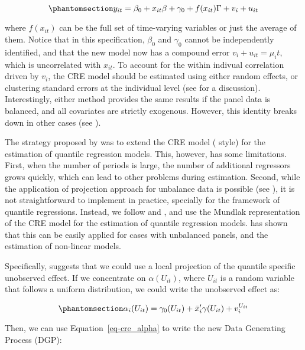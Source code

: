 \documentclass[bib]{statapress}
\begin{document}
\begin{equation}\phantomsection\label{eq-cre-final}{y_{it} = \beta_0 + x_{it}\beta  + \gamma_0 + f(x_{it})\Gamma + v_i + u_{it}
}\end{equation}

where \(f(x_{it})\) can be the full set of time-varying variables or
just the average of them. Notice that in this specification, \(\beta_0\)
and \(\gamma_0\) cannot be independently identified, and that the new
model now has a compound error \(v_i + u_{it}=\mu_it\), which is
uncorrelated with \(x_{it}\). To account for the within indivual
correlation driven by \(v_i\), the CRE model should be estimated using
either random effects, or clustering standard errors at the individual
level (see \citet{wooldridge2010} for a discussion). Interestingly,
either method provides the same results if the panel data is balanced,
and all covariates are strictly exogenous. However, this identity breaks
down in other cases (see \citet{abrevaya2013}).

The strategy proposed by \citet{abrevaya2008} was to extend the CRE
model (\citet{chamberlain1982} style) for the estimation of quantile
regression models. This, however, has some limitations. First, when the
number of periods is large, the number of additional regressors grows
quickly, which can lead to other problems during estimation. Second,
while the application of \citet{chamberlain1982} projection approach for
unbalance data is possible (see \citet{abrevaya2013}), it is not
straightforward to implement in practice, specially for the framework of
quantile regressions. Instead, we follow \citet{wooldridge2010} and
\citet{wooldridge2019}, and use the Mundlak representation of the CRE
model for the estimation of quantile regression models.
\citet{wooldridge2019} has shown that this can be easily applied for
cases with unbalanced panels, and the estimation of non-linear models.

Specifically, \citet{wooldridge2010} suggests that we could use a local
projection of the quantile specific unobserved effect. If we concentrate
on \(\alpha(U_{it})\), where \(U_{it}\) is a random variable that
follows a uniform distribution, we could write the unobserved effect as:

\begin{equation}\phantomsection\label{eq-cre_alpha}{\alpha_i(U_{it})=\gamma_0(U_{it})+\bar x_i'\gamma(U_{it}) + v^{U_{it}}_i
}\end{equation}

Then, we can use Equation~\ref{eq-cre_alpha} to write the new Data
Generating Process (DGP):
\end{document}
